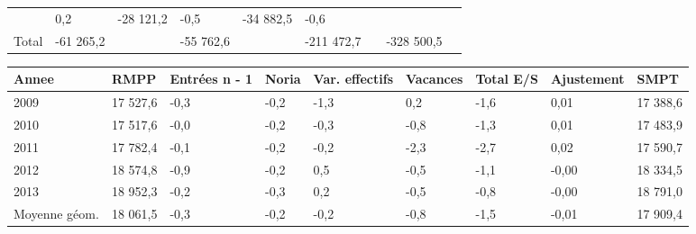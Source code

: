 \begin{longtable}[]{@{}lllllllll@{}}
\begin{minipage}[t]{0.16\columnwidth}
\end{minipage} & \begin{minipage}[t]{0.06\columnwidth}\raggedright
0,2\strut
\end{minipage} & \begin{minipage}[t]{0.12\columnwidth}\raggedright
-28 121,2\strut
\end{minipage} & \begin{minipage}[t]{0.06\columnwidth}\raggedright
-0,5\strut
\end{minipage} & \begin{minipage}[t]{0.09\columnwidth}\raggedright
-34 882,5\strut
\end{minipage} & \begin{minipage}[t]{0.06\columnwidth}\raggedright
-0,6\strut
\end{minipage}\tabularnewline
\begin{minipage}[t]{0.05\columnwidth}\raggedright
Total\strut
\end{minipage} & \begin{minipage}[t]{0.10\columnwidth}\raggedright
-61 265,2\strut
\end{minipage} & \begin{minipage}[t]{0.06\columnwidth}\raggedright
\strut
\end{minipage} & \begin{minipage}[t]{0.16\columnwidth}\raggedright
-55 762,6\strut
\end{minipage} & \begin{minipage}[t]{0.06\columnwidth}\raggedright
\strut
\end{minipage} & \begin{minipage}[t]{0.12\columnwidth}\raggedright
-211 472,7\strut
\end{minipage} & \begin{minipage}[t]{0.06\columnwidth}\raggedright
\strut
\end{minipage} & \begin{minipage}[t]{0.09\columnwidth}\raggedright
-328 500,5\strut
\end{minipage} & \begin{minipage}[t]{0.06\columnwidth}\raggedright
\strut
\end{minipage}\tabularnewline
\bottomrule
\end{longtable}

\begin{longtable}[]{@{}lllllllll@{}}
\toprule
Annee & RMPP & Entrées n - 1 & Noria & Var. effectifs & Vacances & Total
E/S & Ajustement & SMPT\tabularnewline
\midrule
\endhead
2009 & 17 527,6 & -0,3 & -0,2 & -1,3 & 0,2 & -1,6 & 0,01 & 17
388,6\tabularnewline
2010 & 17 517,6 & -0,0 & -0,2 & -0,3 & -0,8 & -1,3 & 0,01 & 17
483,9\tabularnewline
2011 & 17 782,4 & -0,1 & -0,2 & -0,2 & -2,3 & -2,7 & 0,02 & 17
590,7\tabularnewline
2012 & 18 574,8 & -0,9 & -0,2 & 0,5 & -0,5 & -1,1 & -0,00 & 18
334,5\tabularnewline
2013 & 18 952,3 & -0,2 & -0,3 & 0,2 & -0,5 & -0,8 & -0,00 & 18
791,0\tabularnewline
Moyenne géom. & 18 061,5 & -0,3 & -0,2 & -0,2 & -0,8 & -1,5 & -0,01 & 17
909,4\tabularnewline
\bottomrule
\end{longtable}

